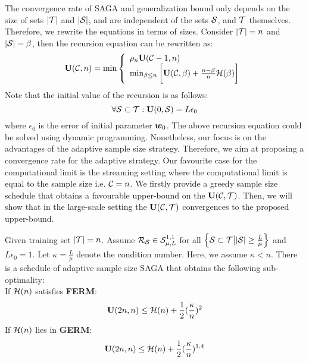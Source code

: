 \documentclass{article}
\begin{document}
The convergence rate of SAGA and generalization bound only depends on
the size of sets $|\T|$ and $|\S|$, and are independent of the sets $\S$,
and $\T$ themselves. Therefore, we rewrite the equations in terms of sizes. Consider
$|\T| = n$ and $|\S| = \beta$, then the recursion equation can be rewritten as: 
\begin{equation} \label{eq:recursion}
	\U(\C,n) = \min
\left\{
	\begin{array}{ll}
		 \rho_{n} \U(\C-1,n)\\
		\min_{\beta \leq n } \bigg[\U(\C,\beta) + \frac{n - \beta}{n}
		\bound(\beta) \bigg]
	\end{array}
\right.
\end{equation}
 Note
that the initial value of the recursion is as follows: 
\begin{equation*}
	\forall \S \subset \T: \U(0,\S) = L \epsilon_0 
\end{equation*}
where $\epsilon_0$ is the error of initial parameter $\w_0$. 
 The above recursion equation could be solved using dynamic
 programming. Nonetheless, our focus is on the advantages of the adaptive sample
 size strategy.
Therefore, we aim at proposing a convergence rate for the adaptive strategy.
Our favourite case for the computational limit is the streaming setting where
the computational limit is equal to the sample size i.e. $\C = n$. We firstly
provide a greedy sample size schedule that obtains a favourable upper-bound on
the $\U(\C,\T)$. Then, we will show that in the large-scale setting the
$\U(\C,\T)$ convergences to the proposed upper-bound.
\begin{lemma} \label{lemma:bound_on_u}
	Given training set $|\T| = n$. Assume $\risk_{\S} \in
	\smoothstrong$ for all $\left\{ \S \subset \T \big\vert |\S| \geq \frac{L}{\mu}
	\right\} $ and $L \epsilon_0 = 1$. Let $\kappa = \frac{L}{\mu}$ denote the
	condition number. Here, we assume $\kappa<n$.
	There is a schedule of adaptive sample size SAGA that obtains the
	following sub-optimality:\\
	If $\bound(n)$ satisfies \textbf{FERM}:  
	\begin{equation*}
		\U(2n,n) \leq \bound(n) + \frac{1}{2}(\frac{\kappa}{ n})^2
	\end{equation*}
	If $\bound(n)$ lies in \textbf{GERM}: 
	\begin{equation*}
		\U(2n,n) \leq \bound(n) + \frac{1}{2}(\frac{\kappa}{n})^{1.4}
	\end{equation*}
\end{lemma}
\end{document}
